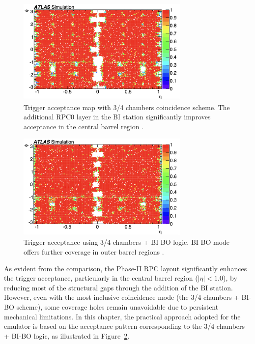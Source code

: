 \begin{figure}[htbp]
  \centering
  \includegraphics[width=0.75\textwidth]{figs/chapter4/trigger_acceptance_map_3_4.png}
  \caption{Trigger acceptance map with 3/4 chambers coincidence scheme. The additional RPC0 layer in the BI station significantly improves acceptance in the central barrel region \cite{TDAQ_TDR}.}
  \label{fig:trigger_acceptance_3_4}
\end{figure}

\begin{figure}[htbp]
  \centering
  \includegraphics[width=0.75\textwidth]{figs/chapter4/trigger_acceptance_map_3_4_BI_BO.png}
  \caption{Trigger acceptance using 3/4 chambers + BI-BO logic. BI-BO mode offers further coverage in outer barrel regions \cite{TDAQ_TDR}.}
  \label{fig:trigger_acceptance_3_4_BI_BO}
\end{figure}

As evident from the comparison, the Phase-II RPC layout significantly enhances the trigger acceptance, particularly in the central barrel region ($|\eta| < 1.0$), by reducing most of the structural gaps through the addition of the BI station. However, even with the most inclusive coincidence mode (the 3/4 chambers + BI-BO scheme), some coverage holes remain unavoidable due to persistent mechanical limitations. In this chapter, the practical approach adopted for the emulator is based on the acceptance pattern corresponding to the 3/4 chambers + BI-BO logic, as illustrated in Figure~\ref{fig:trigger_acceptance_3_4_BI_BO}.

